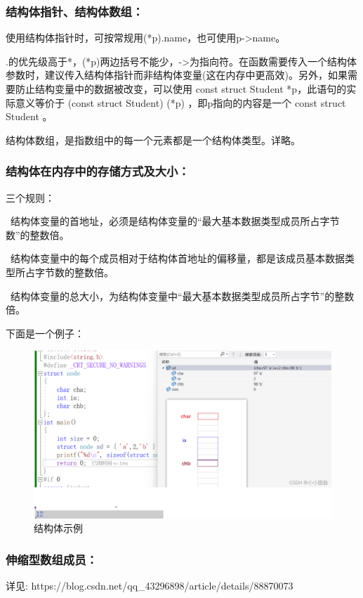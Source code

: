 \documentclass[zihao=-4,UTF8]{report}
\begin{document}
\subsubsection{结构体指针、结构体数组：}
使用结构体指针时，可按常规用(*p).name，也可使用p->name。\par
{\color{gray}\small .的优先级高于*，(*p)两边括号不能少，->为指向符。在函数需要传入一个结构体参数时，建议传入结构体指针而非结构体变量(这在内存中更高效)。另外，如果需要防止结构变量中的数据被改变，可以使用 const struct Student *p，此语句的实际意义等价于 (const struct Student) (*p) ，即p指向的内容是一个 const struct Student 。}\par
结构体数组，是指数组中的每一个元素都是一个结构体类型。详略。
\subsubsection{结构体在内存中的存储方式及大小：}
三个规则：\par
{}\ 结构体变量的首地址，必须是结构体变量的“最大基本数据类型成员所占字节数”的整数倍。\par
{}\ 结构体变量中的每个成员相对于结构体首地址的偏移量，都是该成员基本数据类型所占字节数的整数倍。\par
{}\ 结构体变量的总大小，为结构体变量中“最大基本数据类型成员所占字节”的整数倍。\par
下面是一个例子：
\begin{figure}[H]
    \centering
    \includegraphics[width=\textwidth]{pic/结构体.png}
    \caption{结构体示例}
\end{figure}
\subsubsection{伸缩型数组成员：}
详见: https://blog.csdn.net/qq\_43296898/article/details/88870073
\end{document}
